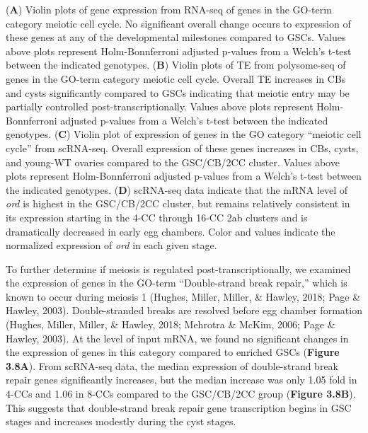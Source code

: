 \documentclass[12pt,oneside]{reedthesis}
\begin{document}
\setlength\parindent{0pt}(\textbf{A}) Violin plots of gene expression from RNA-seq of genes in the GO-term category meiotic cell cycle. No significant overall change occurs to expression of these genes at any of the developmental milestones compared to GSCs. Values above plots represent Holm-Bonnferroni adjusted p-values from a Welch's t-test between the indicated genotypes. (\textbf{B}) Violin plots of TE from polysome-seq of genes in the GO-term category meiotic cell cycle. Overall TE increases in CBs and cysts significantly compared to GSCs indicating that meiotic entry may be partially controlled post-transcriptionally. Values above plots represent Holm-Bonnferroni adjusted p-values from a Welch's t-test between the indicated genotypes. (\textbf{C}) Violin plot of expression of genes in the GO category ``meiotic cell cycle'' from scRNA-seq. Overall expression of these genes increases in CBs, cysts, and young-WT ovaries compared to the GSC/CB/2CC cluster. Values above plots represent Holm-Bonnferroni adjusted p-values from a Welch's t-test between the indicated genotypes. (\textbf{D}) scRNA-seq data indicate that the mRNA level of \emph{ord} is highest in the GSC/CB/2CC cluster, but remains relatively consistent in its expression starting in the 4-CC through 16-CC 2ab clusters and is dramatically decreased in early egg chambers. Color and values indicate the normalized expression of \emph{ord} in each given stage.


To further determine if meiosis is regulated post-transcriptionally, we
examined the expression of genes in the GO-term ``Double-strand break
repair,'' which is known to occur during meiosis 1
(Hughes, Miller, Miller, \& Hawley, 2018; Page \& Hawley, 2003). Double-stranded breaks are
resolved before egg chamber formation
(Hughes, Miller, Miller, \& Hawley, 2018; Mehrotra \& McKim, 2006; Page \& Hawley, 2003). At the level of input mRNA,
we found no significant changes in the expression of genes in this
category compared to enriched GSCs (\textbf{Figure 3.8A}). From scRNA-seq data,
the median expression of double-strand break repair genes significantly
increases, but the median increase was only 1.05 fold in 4-CCs and 1.06
in 8-CCs compared to the GSC/CB/2CC group (\textbf{Figure 3.8B}). This suggests
that double-strand break repair gene transcription begins in GSC stages
and increases modestly during the cyst stages.
\end{document}
